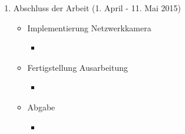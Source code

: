 \begin{enumerate}
\item Abschluss der Arbeit (1. April - 11. Mai 2015)
\begin{itemize}
\item Implementierung Netzwerkkamera
\begin{itemize}
\item
\end{itemize}
\item Fertigstellung Ausarbeitung
\begin{itemize}
\item 
\end{itemize}
\item  Abgabe
\begin{itemize}
\item 
\end{itemize}
\end{itemize}

\end{enumerate}

